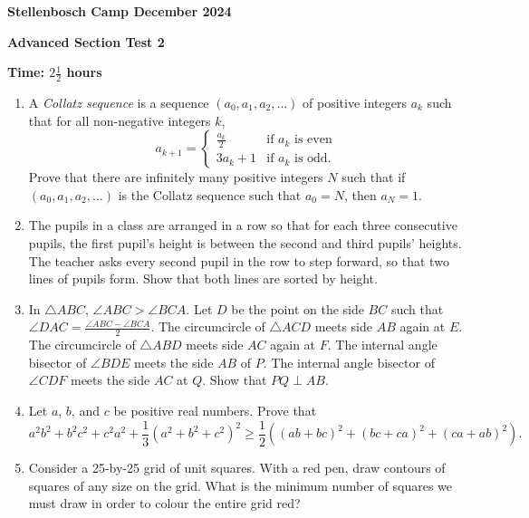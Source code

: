 \documentclass[12pt]{article}
\begin{document}
\begin{center}
\textbf{Stellenbosch Camp December 2024}

\textbf{Advanced Section Test 2}

\textbf{Time: \(2 \frac{1}{2}\) hours}
\end{center}
\begin{enumerate}
\item A \emph{Collatz sequence} is a sequence \((a_{0}, a_{1}, a_{2}, \ldots)\) of positive integers \(a_{k}\) such that for all non-negative integers \(k\),
\[a_{k + 1} = \begin{cases}
\frac{a_{k}}{2} & \textrm{if \(a_{k}\) is even}\\
3a_{k} + 1 & \textrm{if \(a_{k}\) is odd.}
\end{cases}\]
Prove that there are infinitely many positive integers \(N\) such that if \((a_{0}, a_{1}, a_{2}, \ldots)\) is the Collatz sequence such that \(a_{0} = N\), then \(a_{N} = 1\).
\item The pupils in a class are arranged in a row so that for each three consecutive pupils, the first pupil's height is between the second and third pupils' heights. The teacher asks every second pupil in the row to step forward, so that two lines of pupils form. Show that both lines are sorted by height.
\item In $\triangle ABC$, $\angle ABC > \angle BCA$. Let $D$ be the point on the side $BC$ such that $\angle DAC = \frac{\angle ABC - \angle BCA}{2}$. The circumcircle of $\triangle ACD$ meets side $AB$ again at $E$. The circumcircle of $\triangle ABD$ meets side $AC$ again at $F$. The internal angle bisector of $\angle BDE$ meets the side $AB$ of $P$. The internal angle bisector of $\angle CDF$ meets the side $AC$ at $Q$. Show that $PQ \perp AB$.
\item Let \(a\), \(b\), and \(c\) be positive real numbers. Prove that
\[a^{2}b^{2} + b^{2}c^{2} + c^{2}a^{2} + \frac{1}{3}(a^{2} + b^{2} + c^{2})^{2} \geqslant \frac{1}{2}((ab + bc)^{2} + (bc + ca)^{2} + (ca + ab)^{2}).\]
\item Consider a 25-by-25 grid of unit squares. With a red pen, draw contours of squares of any size on the grid. What is the minimum number of squares we must draw in order to colour the entire grid red?
\end{enumerate}
\end{document}
